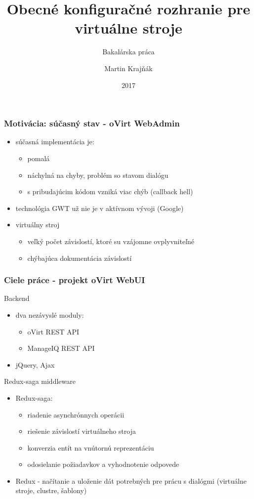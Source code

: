 \documentclass[pdf]{beamer}
\title{Obecné konfiguračné rozhranie pre virtuálne stroje}
\subtitle{Bakalárska práca}
\author{Martin Krajňák}
\date{2017}
\begin{document}
\begin{frame}
\titlepage
\end{frame}


\begin{frame}
\frametitle{Motivácia: súčasný stav - oVirt WebAdmin}
\begin{itemize}
\item súčasná implementácia je:
\begin{itemize}
\item pomalá
\item náchylná na chyby, problém so stavom dialógu
\item s pribudajúcim kódom vzniká viac chýb (callback hell)
\end{itemize}
\item technológia GWT už nie je v aktívnom vývoji (Google)
\item virtuálny stroj 
\begin{itemize}
\item veľký počet závislostí, ktoré su vzájomne ovplyvniteľné
\item chýbajúca dokumentácia závislostí
\end{itemize}
\end{itemize}
\end{frame}


\begin{frame}
\frametitle{Ciele práce - projekt oVirt WebUI}
\begin{block}{Backend}

\begin{itemize}
\item dva nezávyslé moduly:

\begin{itemize}
\item oVirt REST API
\item ManageIQ REST API
\end{itemize}

\item jQuery, Ajax
\end{itemize}

\end{block}

\begin{block}{Redux-saga middleware}
\begin{itemize}
\item Redux-saga:
\begin{itemize}
\item riadenie asynchrónnych operácii
\item riešenie závislostí virtuálneho stroja
\item konverzia entít na vnútornú reprezentáciu
\item odosielanie požiadavkov a vyhodnotenie odpovede
\end{itemize}
\item Redux - načítanie a uloženie dát potrebných pre prácu s dialógmi (virtuálne stroje, clustre, šablony)
\end{itemize}
\end{block}

\end{frame}
\end{document}
